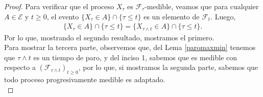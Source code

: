 \begin{proof}
\noindent Para verificar que el proceso $X_{\tau}$ es $\mathcal{F}_{\tau}$-medible, veamos que para cualquier $A \in \mathcal{E}$ y $t \geq 0$, el evento $\{X_{\tau} \in A\} \cap \{\tau \leq t\}$ es un elemento de $\mathcal{F}_t$. Luego,
	\begin{align*}
    \{X_{\tau} \in A\} \cap \{\tau \leq t\} = \{X_{\tau \wedge t} \in A\} \cap \{\tau \leq t\}.
    \end{align*}
    Por lo que, mostrando el segundo resultado, mostramos el primero. \\

Para mostrar la tercera parte, observemos que, del Lema \ref{paromaxmin} tenemos que $\tau \wedge t$ es un tiempo de paro, y del inciso 1, sabemos que es medible con respecto a $(\mathcal{F}_{\tau \wedge t})_{t \geq 0}$, por lo que, si mostramos la segunda parte, sabemos que todo proceso progresivamente medible es adaptado. \\


\end{proof}
